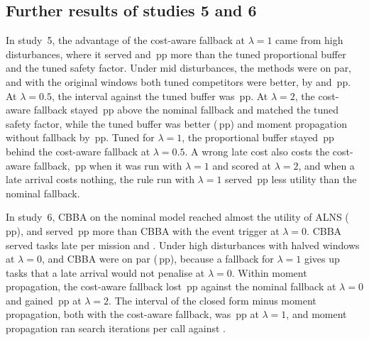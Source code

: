 \subsection{Further results of studies 5 and 6}
In study~5, the advantage of the cost-aware fallback at $\lambda=1$ came from high disturbances, where it served
 and \,pp more than the tuned proportional buffer and the tuned
safety factor. Under mid disturbances, the methods were on par, and with the original windows both tuned competitors
were better, by  and \,pp. At $\lambda=0.5$, the interval
against the tuned buffer was \,pp. At $\lambda=2$, the cost-aware fallback stayed
\,pp above the nominal fallback and matched the tuned safety factor, while the tuned buffer was
better (\,pp) and moment propagation without fallback by \,pp. Tuned for
$\lambda=1$, the proportional buffer stayed \,pp behind the cost-aware fallback at
$\lambda=0.5$. A wrong late cost also costs the cost-aware fallback, \,pp when it was run with
$\lambda=1$ and scored at $\lambda=2$, and when a late arrival costs nothing, the rule run with $\lambda=1$ served
\,pp less utility than the nominal fallback.

In study~6, CBBA on the nominal model reached almost the utility of ALNS (\,pp), and \mname{}
served \,pp more than CBBA with the event trigger at $\lambda=0$. CBBA served 
tasks late per mission and \mname{} . Under high disturbances with halved windows at $\lambda=0$, \mname{}
and CBBA were on par (\,pp), because a fallback for $\lambda=1$ gives up tasks that a late
arrival would not penalise at $\lambda=0$. Within moment propagation, the cost-aware fallback lost
\,pp against the nominal fallback at $\lambda=0$ and gained \,pp at $\lambda=2$.
The interval of the closed form minus moment propagation, both with the cost-aware fallback, was \,pp
at $\lambda=1$, and moment propagation ran  search iterations per call against .

